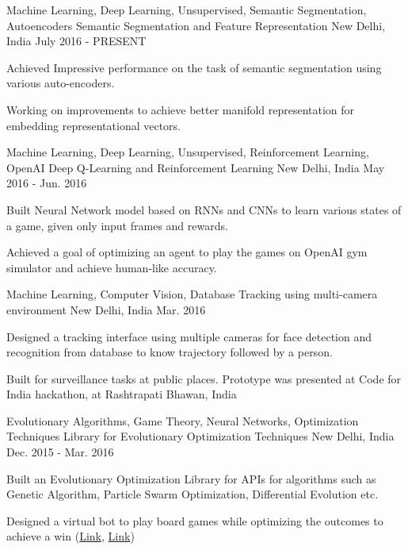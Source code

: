 \begin{cventries}
  \cventry
    {Machine Learning, Deep Learning, Unsupervised, Semantic Segmentation, Autoencoders}
    {Semantic Segmentation and Feature Representation}
    {New Delhi, India}
    {July 2016 - PRESENT}
    {
      \begin{cvitems}
        \item {Achieved Impressive performance on the task of semantic segmentation using various auto-encoders.}
        \item {Working on improvements to achieve better manifold representation for embedding representational vectors.}
      \end{cvitems}
    }
  \cventry
    {Machine Learning, Deep Learning, Unsupervised, Reinforcement Learning, OpenAI}
    {Deep Q-Learning and Reinforcement Learning}
    {New Delhi, India}
    {May 2016 - Jun. 2016}
    {
      \begin{cvitems}
        \item {Built Neural Network model based on RNNs and CNNs to learn various states of a game, given only input frames and rewards.}
        \item {Achieved a goal of optimizing an agent to play the games on OpenAI gym simulator and achieve human-like accuracy.}
      \end{cvitems}
    }
  \cventry
    {Machine Learning, Computer Vision, Database}
    {Tracking using multi-camera environment}
    {New Delhi, India}
    {Mar. 2016}
    {
      \begin{cvitems}
        \item {Designed a tracking interface using multiple cameras for face detection and recognition from database to know trajectory followed by a person.}
        \item {Built for surveillance tasks at public places. Prototype was presented at Code for India hackathon, at Rashtrapati Bhawan, India}
      \end{cvitems}
    }
  \cventry
    {Evolutionary Algorithms, Game Theory, Neural Networks, Optimization Techniques}
    {Library for Evolutionary Optimization Techniques}
    {New Delhi, India}
    {Dec. 2015 - Mar. 2016}
    {
      \begin{cvitems}
        \item {Built an Evolutionary Optimization Library for APIs for algorithms such as Genetic Algorithm, Particle Swarm Optimization, Differential Evolution etc.}
        \item {Designed a virtual bot to play board games while optimizing the outcomes to achieve a win (\href{https://github.com/shubham1810/Mathematical_optimization}{Link}, \href{https://github.com/shubham1810/nn_tic_tac_toe}{Link})}

\end{cvitems}}
\end{cventries}

